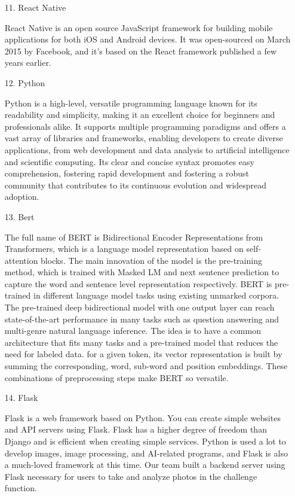 \documentclass[conference]{IEEEtran}
\begin{document}
\begin{enumerate}
\begin{enumerate}
        \item[11.]React Native \cite{waren2016cross}
        \item[]React Native is an open source JavaScript framework for building mobile applications for both iOS and Android devices. It was open-sourced on March 2015 by Facebook, and it's based on the React framework published a few years earlier. \\
        
        \item[12.]Python
        \item[]Python is a high-level, versatile programming language known for its readability and simplicity, making it an excellent choice for beginners and professionals alike. It supports multiple programming paradigms and offers a vast array of libraries and frameworks, enabling developers to create diverse applications, from web development and data analysis to artificial intelligence and scientific computing. Its clear and concise syntax promotes easy comprehension, fostering rapid development and fostering a robust community that contributes to its continuous evolution and widespread adoption.\\

        \item[13.]Bert \cite{affi2021blc}
        \item[]The full name of BERT is Bidirectional Encoder Representations from Transformers, which is a language model representation based on self-attention blocks. The main innovation of the model is the pre-training method, which is trained with Masked LM and next sentence prediction to capture the word and sentence level representation respectively. BERT is pre-trained in different language model tasks using existing unmarked corpora. The pre-trained deep bidirectional model with one output layer can reach state-of-the-art performance in many tasks such as question answering and multi-genre natural language inference. The idea is to have a common architecture that fits many tasks and a pre-trained model that reduces the need for labeled data. for a given token, its vector representation is built by summing the corresponding, word, sub-word and position embeddings. These combinations of preprocessing steps make BERT so versatile. \\

        \item[14.]Flask
        \item[]Flask is a web framework based on Python. You can create simple websites and API servers using Flask. Flask has a higher degree of freedom than Django and is efficient when creating simple services. Python is used a lot to develop images, image processing, and AI-related programs, and Flask is also a much-loved framework at this time. Our team built a backend server using Flask necessary for users to take and analyze photos in the challenge function.\\

        
    \end{enumerate}
\end{enumerate}
\end{document}

